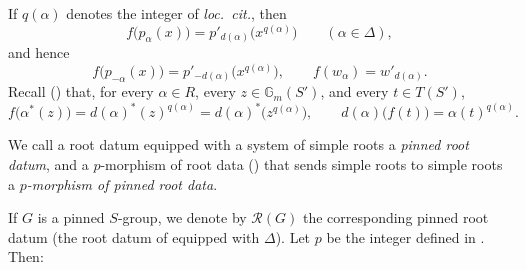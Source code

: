 If \(q(\alpha)\) denotes the integer of \textit{loc.\ cit.}, then
\[
  f\bigl(p_\alpha(x)\bigr)
    =p'_{d(\alpha)}\bigl(x^{q(\alpha)}\bigr)
    \qquad (\alpha\in\Delta),
\]
and hence
\[
  f\bigl(p_{-\alpha}(x)\bigr)
    =p'_{-d(\alpha)}\bigl(x^{q(\alpha)}\bigr),
  \qquad
  f(w_\alpha)=w'_{d(\alpha)} .
\]
Recall () that, for every \(\alpha\in R\), every
\(z\in\mathbb G_m(S')\), and every \(t\in T(S')\),
\[
  f\bigl(\alpha^\ast(z)\bigr)
    =d(\alpha)^\ast(z)^{q(\alpha)}
    =d(\alpha)^\ast\bigl(z^{q(\alpha)}\bigr),
  \qquad
  d(\alpha)\bigl(f(t)\bigr)=\alpha(t)^{q(\alpha)} .
\]

We call a root datum equipped with a system of simple roots a
\emph{pinned root datum}, and a \(p\)-morphism of root data
() that sends simple roots to simple roots a
\emph{\(p\)-morphism of pinned root data}.

If \(G\) is a pinned \(S\)-group, we denote by \(\mathscr R(G)\) the
corresponding pinned root datum (the root datum of 
equipped with \(\Delta\)). Let \(p\) be the integer defined in
. Then:


